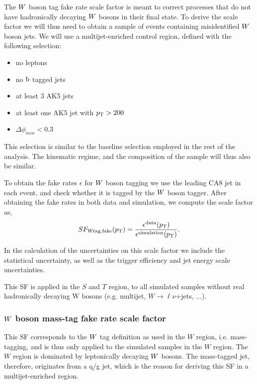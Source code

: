 The $W$ boson tag fake rate scale factor is meant to correct processes that do not have
hadronically decaying $W$ bosons in their final state. To derive the scale factor we will thus need
to obtain a sample of events containing misidentified $W$ boson jets. 
We will use a multijet-enriched control region, defined with the following selection:
\begin{itemize}
\item no leptons
\item no $\mathrm{b}$ tagged jets
\item at least 3 AK5 jets
\item at least one AK5 jet with $p_{\mathrm{T}}>200$\GeV
\item $\Delta\phi_{min} < 0.3$
\end{itemize}
This selection is similar to the baseline selection employed in the rest of the analysis. The
kinematic regime, and the composition of the sample will thus also be similar. 

To obtain the fake rates $\epsilon$ for $W$ boson tagging we use the leading CA8 jet in each
event, and check whether it is tagged by the $W$ boson tagger. After obtaining the
fake rates in both data and simulation, we compute the scale factor as,
\begin{equation}
SF_\textrm{Wtag,fake}(p_{\mathrm{T}}) =
\frac{\epsilon^{\textrm{data}}(p_{\mathrm{T}})}{\epsilon^{\textrm{simulation}}(p_{\mathrm{T}})}.
\end{equation}  

In the calculation of the uncertainties on this scale factor we include the statistical uncertainty,
as well as the trigger efficiency and jet energy scale uncertainties. 

This SF is applied in the $S$ and $T$ region,
to all simulated samples without real hadronically decaying W bosons (e.g. multijet,
$W\rightarrow\ell\nu$+jets, ...).

\subsubsection{\texorpdfstring{$W$}{W} boson mass-tag fake rate scale factor
\label{sec:wmasstag_fake_sf}}
This SF corresponds to the $W$ tag
definition as used in the $W$ region, i.e. mass-tagging, and is thus only applied to the simulated
samples in the $W$ region. 
The $W$ region is dominated by leptonically decaying $W$ bosons. The mass-tagged jet, therefore,
originates from a q/g jet, which is the reason for deriving this SF in a multijet-enriched
region. 
